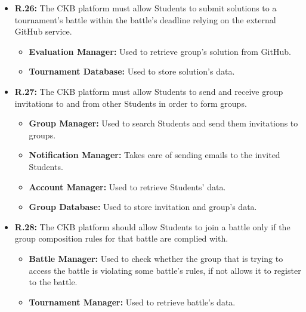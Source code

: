 \documentclass{article}
\begin{document}
{\begin{itemize}
\begin{itemize}
\begin{itemize}
              \item \textbf{Battle Manager:} Used to allow Students to register to a battle if the
              registration deadline has not expired yet.
              \item \textbf{Tournament Manager:} Used to retrieve battle's data.
              \item \textbf{Tournament Database:} Used to store Student's registration to the battle.
          \end{itemize}
    \item \textbf{R.26:} The CKB platform must allow Students to submit solutions to a tournament's battle
        within the battle's deadline relying on the external GitHub service.
          \begin{itemize}
              \item \textbf{Evaluation Manager:} Used to retrieve group's solution from GitHub.
              \item \textbf{Tournament Database:} Used to store solution's data.
          \end{itemize}
    \item \textbf{R.27:} The CKB platform must allow Students to send and receive group invitations to and from
          other Students in order to form groups.
          \begin{itemize}
              \item \textbf{Group Manager:} Used to search Students and send them invitations to groups.
              \item \textbf{Notification Manager:} Takes care of sending emails to the invited Students.
              \item \textbf{Account Manager:} Used to retrieve Students' data.
              \item \textbf{Group Database:} Used to store invitation and group's data.
          \end{itemize}
    \item \textbf{R.28:} The CKB platform should allow Students to join a battle only if the group composition rules
          for that battle are complied with.
          \begin{itemize}
              \item \textbf{Battle Manager:} Used to check whether the group that is trying to
              access the battle is violating some battle's rules, if not allows it to register to
              the battle.
              \item \textbf{Tournament Manager:} Used to retrieve battle's data.

\end{itemize}
\end{itemize}
\end{itemize}}
\end{document}

